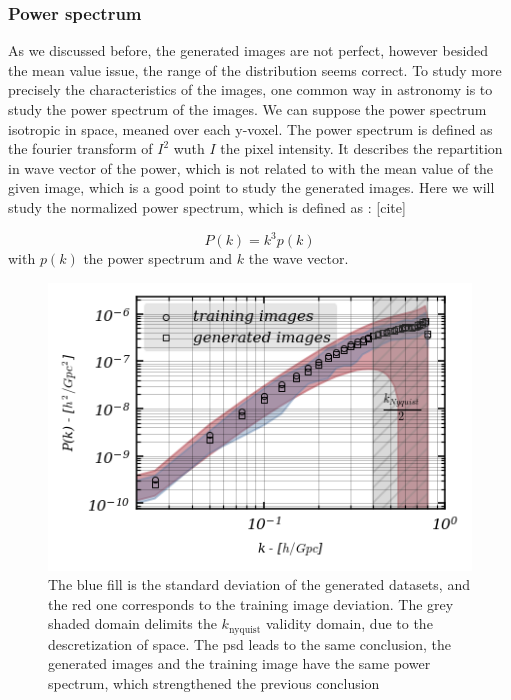 \documentclass[11pt,a4paper]{report}
\begin{document}
\begin{multicols*}{2}
    \subsubsection{Power spectrum}

    As we discussed before, the generated images are not perfect, however besided the mean value issue, the range of the distribution seems correct. To study more precisely the characteristics of the images, one common way in astronomy is to study the power spectrum of the images. We can suppose the power spectrum isotropic in space, meaned over each y-voxel.
    The power spectrum is defined as the fourier transform of $I^2$ wuth $I$ the pixel intensity. It describes the repartition in wave vector of the power, which is not related to with the mean value of the given image, which is a good point to study the generated images.
    Here we will study the normalized power spectrum, which is defined as : [cite]

    $$P(k) = k^3 p(k)$$
    with $p(k)$ the power spectrum and $k$ the wave vector.

    \begin{figure}[H]
        \begin{small}
            \begin{center}
                \includegraphics[width=0.95\linewidth]{figure/spectral_graph.png}
            \end{center}
            \caption{The blue fill is the standard deviation of the generated datasets, and the red one corresponds to the training image deviation. The grey shaded domain delimits the $k_{\text{nyquist}}$ validity domain, due to the descretization of space.
                The psd leads to the same conclusion, the generated images and the training image have the same power spectrum, which strengthened the previous conclusion}
            \label{fig:psd}
        \end{small}
    \end{figure}


\end{multicols*}
\end{document}
